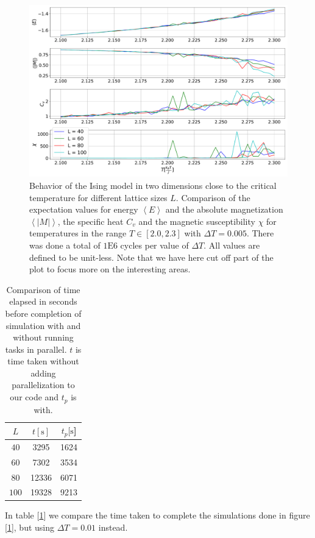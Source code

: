 \documentclass[../main.tex]{subfiles}
\begin{document}
\begin{figure}[htb!]
    \centering
    \includegraphics[trim=0.cm 0.cm 0.cm 0.cm, clip,width=1.0\textwidth]{../figures/mpi_values.pdf}
    \caption{Behavior of the Ising model in two dimensions close to the critical temperature for different lattice sizes $L$. Comparison of the expectation values for energy $\left\langle E \right\rangle$ and the absolute magnetization $\left\langle |M| \right\rangle$, the specific heat $C_v$ and the magnetic susceptibility $\chi$ for temperatures in the range $T \in [2.0, 2.3]$ with $\Delta T = 0.005$. There was done a total of $1\text{E}6$ cycles per value of $\Delta T$. All values are defined to be unit-less. Note that we have here cut off part of the plot to focus more on the interesting areas.}
    \label{fig:parallelisation}
\end{figure}
\newpage


\begin{table}[!htb]
\caption{Comparison of time elapsed in seconds before completion of simulation with and without running tasks in parallel. $t$ is time taken without adding parallelization to our code and $t_p$ is with. } 
\begin{center}
\begin{tabular}{ c c c }
\toprule
$L$ & $t[\text{s}]$ & $t_{p}[\text{s}$] \\

\midrule
$40$ & 3295 & 1624\\
$60$ & 7302 & 3534\\
$80$ &  12336 & 6071 \\
$100$ &  19328 & 9213\\


\midrule
\end{tabular}
\end{center}
\label{tab:timing}
\end{table}


In table [\ref{tab:timing}] we compare the time taken to complete the simulations done in figure [\ref{fig:parallelisation}], but using $\Delta T = 0.01$ instead. 
\end{document}
